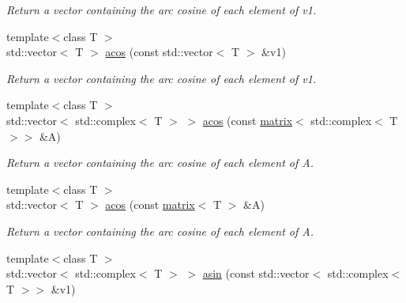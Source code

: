\begin{DoxyCompactItemize}
\begin{DoxyCompactList}\small\item\em Return a vector containing the arc cosine of each element of v1. \end{DoxyCompactList}\item 
\hypertarget{namespacekeycpp_a01c85865832f197d01d4f332121bc018}{{\footnotesize template$<$class T $>$ }\\std\-::vector$<$ T $>$ \hyperlink{namespacekeycpp_a01c85865832f197d01d4f332121bc018}{acos} (const std\-::vector$<$ T $>$ \&v1)}\label{namespacekeycpp_a01c85865832f197d01d4f332121bc018}

\begin{DoxyCompactList}\small\item\em Return a vector containing the arc cosine of each element of v1. \end{DoxyCompactList}\item 
\hypertarget{namespacekeycpp_a88bedf42ff19672e0ddff3c5547d28d2}{{\footnotesize template$<$class T $>$ }\\std\-::vector$<$ std\-::complex$<$ T $>$ $>$ \hyperlink{namespacekeycpp_a88bedf42ff19672e0ddff3c5547d28d2}{acos} (const \hyperlink{classkeycpp_1_1matrix}{matrix}$<$ std\-::complex$<$ T $>$$>$ \&A)}\label{namespacekeycpp_a88bedf42ff19672e0ddff3c5547d28d2}

\begin{DoxyCompactList}\small\item\em Return a vector containing the arc cosine of each element of A. \end{DoxyCompactList}\item 
\hypertarget{namespacekeycpp_acf579fcfa75e569f491946af9e09ba34}{{\footnotesize template$<$class T $>$ }\\std\-::vector$<$ T $>$ \hyperlink{namespacekeycpp_acf579fcfa75e569f491946af9e09ba34}{acos} (const \hyperlink{classkeycpp_1_1matrix}{matrix}$<$ T $>$ \&A)}\label{namespacekeycpp_acf579fcfa75e569f491946af9e09ba34}

\begin{DoxyCompactList}\small\item\em Return a vector containing the arc cosine of each element of A. \end{DoxyCompactList}\item 
\hypertarget{namespacekeycpp_ac038300a49474532929f16d892349ab6}{{\footnotesize template$<$class T $>$ }\\std\-::vector$<$ std\-::complex$<$ T $>$ $>$ \hyperlink{namespacekeycpp_ac038300a49474532929f16d892349ab6}{asin} (const std\-::vector$<$ std\-::complex$<$ T $>$$>$ \&v1)}\label{namespacekeycpp_ac038300a49474532929f16d892349ab6}


\end{DoxyCompactItemize}
